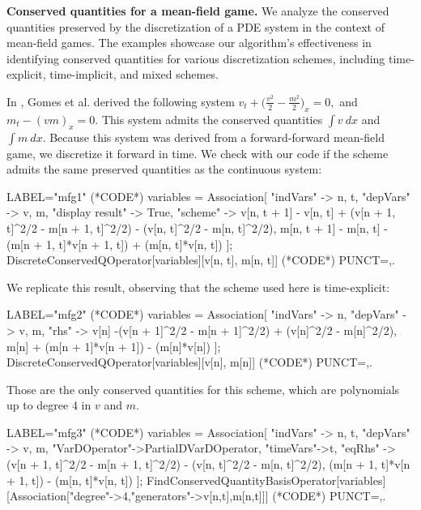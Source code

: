 \documentclass[runningheads]{llncs}
\newcommand{\1}{\chi}
\begin{document}
{\bf Conserved quantities for a mean-field game.}
We analyze the conserved quantities preserved by the discretization of a PDE system in the context of mean-field games.
The examples showcase our algorithm's effectiveness in identifying conserved quantities for various discretization schemes, including time-explicit, time-implicit, and mixed schemes.
\begin{example}
	In \cite{gomes18}, Gomes et al. derived the following system
$
		v_t+\Big(\frac{v^2}{2}-\frac{m^2}{2}\Big)_x=0,$ and $
		m_t-(vm)_x=0.
$
	This system admits the conserved quantities $\int v\ dx$ and $\int m\ dx$.
	Because this system was derived from a forward-forward mean-field game, we discretize it forward in time. We check with our code if the scheme admits the same preserved quantities as the continuous system:
	\begin{EXE}
		LABEL="mfg1"
		(*CODE*)
		variables = Association[
		"indVars" -> {n, t},
		"depVars" -> {v, m},
		"display result" -> True,
		"scheme" -> {v[n, t + 1] - 
			v[n, 
			t] + (v[n + 1, t]^2/2 - m[n + 1, t]^2/2) - (v[n, t]^2/2 - 
			m[n, t]^2/2), 
			m[n, t + 1] - 
			m[n, t] - (m[n + 1, t]*v[n + 1, t]) + (m[n, t]*v[n, t])}
		];
		DiscreteConservedQOperator[variables][{v[n, t], m[n, t]}]
		(*CODE*)
		PUNCT={,.}
	\end{EXE}
	\begin{small}
		
		
	\end{small}
We replicate this result, observing that the scheme used here is time-explicit:
	\begin{EXE}
		LABEL="mfg2"
		(*CODE*)
		variables = Association[
		"indVars" -> {n},
		"depVars" -> {v, m},
		"rhs" -> { 
			v[n] -(v[n + 1]^2/2 - m[n + 1]^2/2) + (v[n]^2/2 - 
			m[n]^2/2), 
			m[n] + (m[n + 1]*v[n + 1]) - (m[n]*v[n])}
		];
		DiscreteConservedQOperator[variables][{v[n], m[n]}]
		(*CODE*)
		PUNCT={,.}
	\end{EXE}
	\begin{small}
		
		
	\end{small}
	Those are the only conserved quantities for this scheme, which are polynomials up to degree 4 in $v$ and $m$.
	\begin{EXE}
		LABEL="mfg3"
		(*CODE*)
		variables = Association[
		"indVars" -> {n, t},
		"depVars" -> {v, m},
		"VarDOperator"->PartialDVarDOperator,
		"timeVars"->{t},
		"eqRhs" -> { 
			(v[n + 1, t]^2/2 - m[n + 1, t]^2/2) - (v[n, t]^2/2 - 
			m[n, t]^2/2), 
			(m[n + 1, t]*v[n + 1, t]) - (m[n, t]*v[n, t])}
		];
		FindConservedQuantityBasisOperator[variables][Association["degree"->4,"generators"->{v[n,t],m[n,t]}]]
		(*CODE*)
		PUNCT={,.}
	\end{EXE}
	\begin{small}
		
		
	\end{small}
\end{example}
\end{document}
